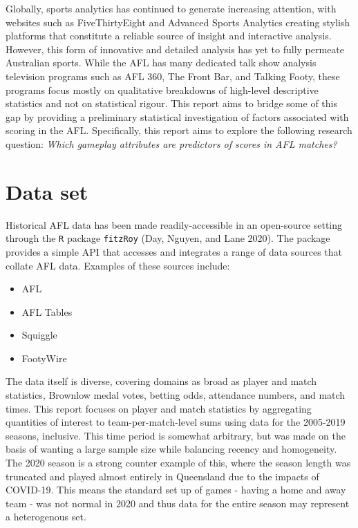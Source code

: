 \documentclass{article}
\begin{document}
Globally, sports analytics has continued to generate increasing attention, with websites such as FiveThirtyEight and Advanced Sports Analytics creating stylish platforms that constitute a reliable source of insight and interactive analysis. However, this form of innovative and detailed analysis has yet to fully permeate Australian sports. While the AFL has many dedicated talk show analysis television programs such as AFL 360, The Front Bar, and Talking Footy, these programs focus mostly on qualitative breakdowns of high-level descriptive statistics and not on statistical rigour. This report aims to bridge some of this gap by providing a preliminary statistical investigation of factors associated with scoring in the AFL. Specifically, this report aims to explore the following research question: \emph{Which gameplay attributes are predictors of scores in AFL matches?}

\hypertarget{data-set}{%
\section{Data set}\label{data-set}}

Historical AFL data has been made readily-accessible in an open-source setting through the \texttt{R} package \texttt{fitzRoy} (Day, Nguyen, and Lane 2020). The package provides a simple API that accesses and integrates a range of data sources that collate AFL data. Examples of these sources include:

\begin{itemize}
  \item{AFL}
  \item{AFL Tables}
  \item{Squiggle}
  \item{FootyWire}
\end{itemize}

The data itself is diverse, covering domains as broad as player and match statistics, Brownlow medal votes, betting odds, attendance numbers, and match times. This report focuses on player and match statistics by aggregating quantities of interest to team-per-match-level sums using data for the 2005-2019 seasons, inclusive. This time period is somewhat arbitrary, but was made on the basis of wanting a large sample size while balancing recency and homogeneity. The 2020 season is a strong counter example of this, where the season length was truncated and played almost entirely in Queensland due to the impacts of COVID-19. This means the standard set up of games - having a home and away team - was not normal in 2020 and thus data for the entire season may represent a heterogenous set.
\end{document}
